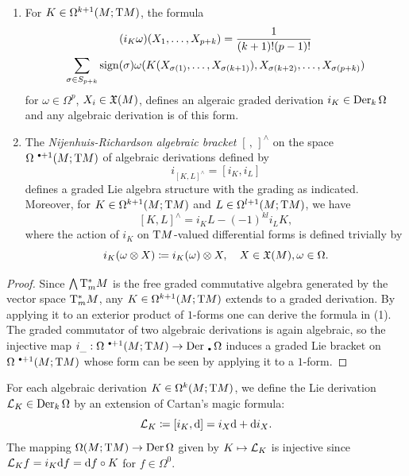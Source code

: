 \begin{prop}
    \begin{enumerate}[label=(\alph*)]
        \item For $K\in \Omega^{k+1}(M;\mathrm{T} M)$, the formula 
        \begin{multline}
            (i_K\omega)(X_1,\ldots,X_{p+k})=\frac{1}{(k+1)!(p-1)!}\\\sum_{\sigma\in S_{p+k}}\operatorname{sign}(\sigma) \omega(K(X_{\sigma(1)},\ldots,X_{\sigma(k+1)}),X_{\sigma(k+2)},\ldots,X_{\sigma(p+k)})
        \end{multline}
        for $\omega\in\Omega^p$, $X_i\in\mathfrak{X}(M)$, defines an algeraic graded derivation $i_K\in \operatorname{Der}_k\Omega$ and any algebraic derivation is of this form.
        \item The \emph{Nijenhuis-Richardson algebraic bracket} $[\,,\,]^{\wedge}$ on the space $\Omega^{\smbullet +1}(M;\T M)$ of algebraic derivations defined by 
        \[i_{[K,L]^{\wedge}}= [i_K,i_L]\]
        defines a graded Lie algebra structure with the grading as indicated. Moreover, for $K\in\Omega^{k+1}(M;\mathrm{T} M)$ and $L\in\Omega^{l+1}(M;\mathrm{T} M)$, we have 
        \[[K,L]^{\wedge}=i_K L-(-1)^{kl}i_L K,\]
        where the action of $i_K$ on $\mathrm{T} M$-valued differential forms is defined trivially by
        \[i_K(\omega\otimes X)\coloneqq i_K(\omega)\otimes X,\quad X\in\mathfrak{X}(M),\omega\in\Omega.\]
    \end{enumerate}
\end{prop}
\begin{proof}
    Since $\bigwedge \mathrm{T}^\ast_m M$ is the free graded commutative algebra generated by the vector space $\mathrm{T}^\ast_m M$, any $K\in \Omega^{k+1}(M;\mathrm{T} M)$ extends to a graded derivation. By applying it to an exterior product of $1$-forms one can derive the formula in (1). The graded commutator of two algebraic derivations is again algebraic, so the injective map $i_{\_}:\Omega^{\smbullet +1}(M;\T M)\to \Der_{\smbullet}\Omega$ induces a graded Lie bracket on $\Omega^{\smbullet+1}(M;\T M)$ whose form can be seen by applying it to a $1$-form.
\end{proof}


\begin{defn}
    For each algebraic derivation $K\in\Omega^k(M;\mathrm{T} M)$, we define the Lie derivation $\mathcal{L}_K\in\operatorname{Der}_k\Omega$ by an extension of Cartan's magic formula:
    \[\mathcal{L}_K\coloneqq [i_K,{\mathrm{d}}]=i_X{\mathrm{d}}+{\mathrm{d}} i_X.\]
    The mapping $\Omega(M;\mathrm{T} M)\to \operatorname{Der}\Omega$ given by $K\mapsto \mathcal{L}_K$ is injective since $\mathcal{L}_K f=i_K{\mathrm{d}} f={\mathrm{d}} f\circ K$ for $f\in\Omega^0$.
\end{defn}

